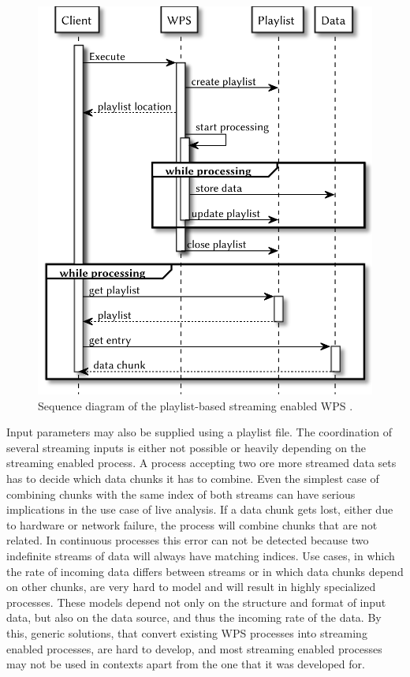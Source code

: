   \begin{figure}[!htb]
    \centering
    \includegraphics[width = 0.54225352112676062\linewidth]{figures/sequence-diagram-previous.pdf}
    \caption{\label{fig:sd:previous}Sequence diagram of the playlist-based streaming enabled WPS \citep{foerster2012live}.}
  \end{figure}

  Input parameters may also be supplied using a playlist file. The coordination of several streaming inputs is either not possible or heavily depending on the streaming enabled process. A process accepting two ore more streamed data sets has to decide which data chunks it has to combine. Even the simplest case of combining chunks with the same index of both streams can have serious implications in the use case of live analysis. If a data chunk gets lost, either due to hardware or network failure, the process will combine chunks that are not related. In continuous processes this error can not be detected because two indefinite streams of data will always have matching indices. Use cases, in which the rate of incoming data differs between streams or in which data chunks depend on other chunks, are very hard to model and will result in highly specialized processes. These models depend not only on the structure and format of input data, but also on the data source, and thus the incoming rate of the data. By this, generic solutions, that convert existing \ac{WPS} processes into streaming enabled processes, are hard to develop, and most streaming enabled processes may not be used in contexts apart from the one that it was developed for.

